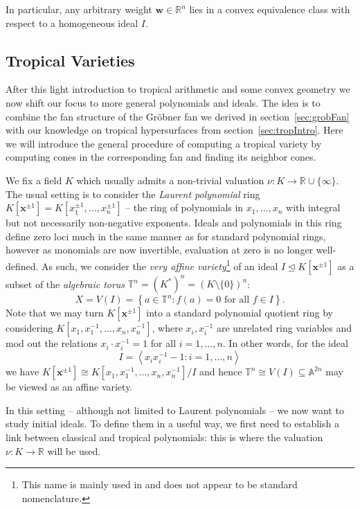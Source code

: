 \documentclass[
  paper=a4,
  titlepage,
  bibliography=totoc,
  listof=totoc,
  pagesize=pdftex
]{scrartcl}
\numberwithin{figure}{section}
\numberwithin{equation}{section}
\numberwithin{table}{section}
\newcommand*\setR{\mathds{R}}
\newcommand*\setA{\mathds{A}}
\newcommand*\setT{\mathds{T}}
\newcommand*\ideal[1]{\left\langle #1 \right\rangle}
\let\vec\mathbf
\let\idealof\trianglelefteq
\theoremstyle{definition}
\numberwithin{definition}{section}
\begin{document}
In particular, any arbitrary weight $\vec w \in \setR^n$ lies in a convex equivalence
class with respect to a homogeneous ideal $I$.

\subsection{Tropical Varieties}
\label{sec:tropVar}

After this light introduction to tropical arithmetic and some convex geometry we now shift
our focus to more general polynomials and ideals. The idea is to combine the fan structure
of the Gröbner fan we derived in section~\ref{sec:grobFan} with our knowledge on tropical
hypersurfaces from section~\ref{sec:tropIntro}. Here we will introduce the general
procedure of computing a tropical variety by computing cones in the corresponding fan and
finding its neighbor cones.

We fix a field $K$ which usually admits a non-trivial valuation $\nu : K \to \setR \cup
\{\infty\}$. The usual setting is to consider the \emph{Laurent polynomial} ring $K[\vec
x^{\pm1}] = K[x_1^{\pm1}, \dots, x_n^{\pm1}]$ -- the ring of polynomials in $x_1, \dots,
x_n$ with integral but not necessarily non-negative exponents. Ideals and polynomials in
this ring define zero loci much in the same manner as for standard polynomial rings,
however as monomials are now invertible, evaluation at zero is no longer well-defined. As
such, we consider the \emph{very affine variety}\footnote{This name is mainly used in
\cite{sturmMacTrop} and does not appear to be standard nomenclature.} of an ideal $I
\idealof K[\vec x^{\pm1}]$ as a subset of the \emph{algebraic torus} $\setT^n = {(K^*)}^n
= {(K \setminus \{0\})}^n$:
\[
  X = V(I) = \left\{ a \in \setT^n : f(a) = 0 \text{ for all $f \in I$} \right\}.
\]
Note that we may turn $K[\vec x^{\pm1}]$ into a standard polynomial quotient ring by
considering $K[x_1,x_1^{-1}, \dots, x_n,x_n^{-1}]$, where $x_i, x_i^{-1}$ are unrelated
ring variables and mod out the relations $x_i\cdot x_i^{-1} = 1$ for all $i=1,\dots,n$.
In other words, for the ideal
\[
  I = \ideal{ x_ix_i^{-1}-1 : i = 1, \dots, n}
\]
we have $K[\vec x^{\pm1}] \cong K[x_1,x_1^{-1}, \dots, x_n,x_n^{-1}]/I$ and hence $\setT^n
\cong V(I) \subseteq \setA^{2n}$ may be viewed as an affine variety.

In this setting -- although not limited to Laurent polynomials -- we now want to study
initial ideals. To define them in a useful way, we first need to establish a link between
classical and tropical polynomials: this is where the valuation $\nu:K\to\setR$ will be
used.
\end{document}
